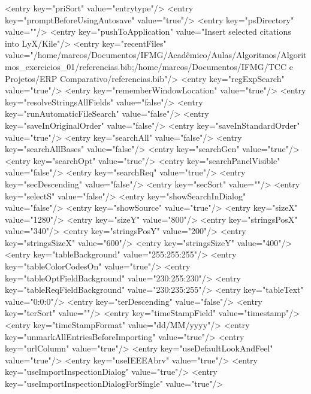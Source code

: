 \begin{codigo}[caption={Código de configuração do programa JabRef em XML}, label={codigo:config-jabref}, language=XML, breaklines=true]
            <entry key="priSort" value="entrytype"/>
            <entry key="promptBeforeUsingAutosave" value="true"/>
            <entry key="psDirectory" value=""/>
            <entry key="pushToApplication" value="Insert selected citations into LyX/Kile"/>
            <entry key="recentFiles" value="/home/marcos/Documentos/IFMG/Acadêmico/Aulas/Algoritmos/Algoritmos_exercicios_01/referencias.bib;/home/marcos/Documentos/IFMG/TCC e Projetos/ERP Comparativo/referencias.bib"/>
            <entry key="regExpSearch" value="true"/>
            <entry key="rememberWindowLocation" value="true"/>
            <entry key="resolveStringsAllFields" value="false"/>
            <entry key="runAutomaticFileSearch" value="false"/>
            <entry key="saveInOriginalOrder" value="false"/>
            <entry key="saveInStandardOrder" value="true"/>
            <entry key="searchAll" value="false"/>
            <entry key="searchAllBases" value="false"/>
            <entry key="searchGen" value="true"/>
            <entry key="searchOpt" value="true"/>
            <entry key="searchPanelVisible" value="false"/>
            <entry key="searchReq" value="true"/>
            <entry key="secDescending" value="false"/>
            <entry key="secSort" value=""/>
            <entry key="selectS" value="false"/>
            <entry key="showSearchInDialog" value="false"/>
            <entry key="showSource" value="true"/>
            <entry key="sizeX" value="1280"/>
            <entry key="sizeY" value="800"/>
            <entry key="stringsPosX" value="340"/>
            <entry key="stringsPosY" value="200"/>
            <entry key="stringsSizeX" value="600"/>
            <entry key="stringsSizeY" value="400"/>
            <entry key="tableBackground" value="255:255:255"/>
            <entry key="tableColorCodesOn" value="true"/>
            <entry key="tableOptFieldBackground" value="230:255:230"/>
            <entry key="tableReqFieldBackground" value="230:235:255"/>
            <entry key="tableText" value="0:0:0"/>
            <entry key="terDescending" value="false"/>
            <entry key="terSort" value=""/>
            <entry key="timeStampField" value="timestamp"/>
            <entry key="timeStampFormat" value="dd/MM/yyyy"/>
            <entry key="unmarkAllEntriesBeforeImporting" value="true"/>
            <entry key="urlColumn" value="true"/>
            <entry key="useDefaultLookAndFeel" value="true"/>
            <entry key="useIEEEAbrv" value="true"/>
            <entry key="useImportInspectionDialog" value="true"/>
            <entry key="useImportInspectionDialogForSingle" value="true"/>

\end{codigo}
